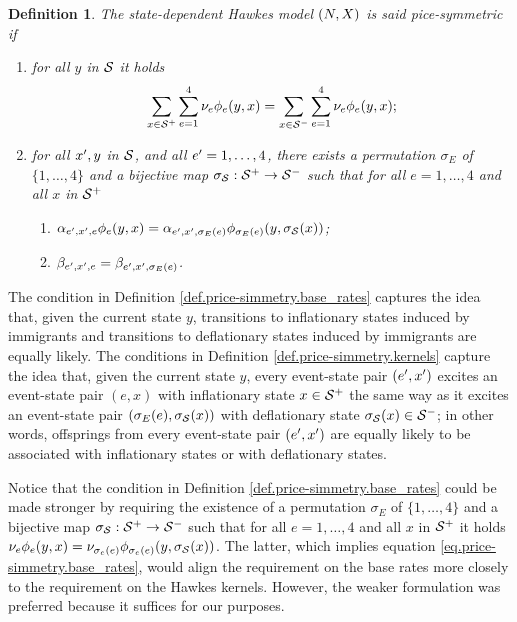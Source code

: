 \documentclass[10pt]{article}
\newtheorem{defi}[thm]{Definition}
\begin{document}
\begin{defi}\label{def.price-simmetry}
 The state-dependent Hawkes model $(N,X)$ is said pice-symmetric if 
 \begin{enumerate}[label={\roman{*}.} , ref={\ref{def.price-simmetry}.\roman{*}}]
 \item\label{def.price-simmetry.base_rates}
 for all $y$ in $\mathcal{S}$ it holds
 \begin{equation}\label{eq.price-simmetry.base_rates}
  \sum_{x\in\mathcal{S}^{+}}\sum_{e=1}^{4}\nu_{e}\phi_{e}(y,x)
  =
  \sum_{x\in\mathcal{S}^{-}}\sum_{e=1}^{4}\nu_{e}\phi_{e}(y,x);
 \end{equation}
\item\label{def.price-simmetry.kernels}
for all $x^{\prime},y$ in $\mathcal{S}$, and  all $e^{\prime} = 1,\dots,4$, there exists a permutation $\sigma_{E}$ of $\lbrace 1,\dots,4\rbrace$ and a bijective map $\sigma_{\mathcal{S}} : \mathcal{S}^{+}\rightarrow\mathcal{S}^{-}$ such that for all $e=1,\dots,4$ and all $x$ in $\mathcal{S}^{+}$
\begin{enumerate}%
\item $\alpha_{e^{\prime},x^{\prime},e}\phi_{e}(y,x) = \alpha_{e^{\prime},x^{\prime},\sigma_{E}(e)} \phi_{\sigma_{E}(e)}(y,\sigma_{\mathcal{S}}(x))$;
\item $\beta_{e^{\prime},x^{\prime},e} = \beta_{e^{\prime},x^{\prime},\sigma_{E}(e)}$.
\end{enumerate}
\end{enumerate}
\end{defi}
The condition in Definition \ref{def.price-simmetry.base_rates}  captures the idea that, given the current state $y$, 
transitions to inflationary states induced by immigrants and transitions to deflationary states induced by immigrants are equally likely.
The conditions in Definition \ref{def.price-simmetry.kernels} capture the idea that, given the current state $y$, every event-state pair $(e^{\prime},x^{\prime})$ excites an  event-state pair $(e,x)$ with inflationary state $x\in\mathcal{S}^{+}$  the same way as it excites an event-state pair $(\sigma_{E}(e),\sigma_{\mathcal{S}}(x))$ with deflationary state $\sigma_{\mathcal{S}}(x) \in\mathcal{S}^{-}$; in other words, offsprings from every event-state pair $(e^{\prime},x^{\prime})$ are equally likely to be associated with inflationary states or with deflationary states. 

Notice that the condition in Definition \ref{def.price-simmetry.base_rates} could be made stronger by requiring the existence of a permutation $\sigma_E$ of $\lbrace 1,\dots,4\rbrace$ and a bijective map $\sigma_{\mathcal{S}} : \mathcal{S}^{+}\rightarrow\mathcal{S}^{-}$ such that for all $e=1,\dots,4$ and all $x$ in $\mathcal{S}^{+}$ it holds $\nu_{e}\phi_{e}(y,x) = \nu_{\sigma_{e}(e)}\phi_{\sigma_{e}(e)}(y,\sigma_{\mathcal{S}}(x))$. The latter, which  implies equation \eqref{eq.price-simmetry.base_rates}, would align the requirement on the base rates more closely to the requirement on the Hawkes kernels. However, the weaker formulation was preferred because it suffices for our purposes. 
\end{document}
